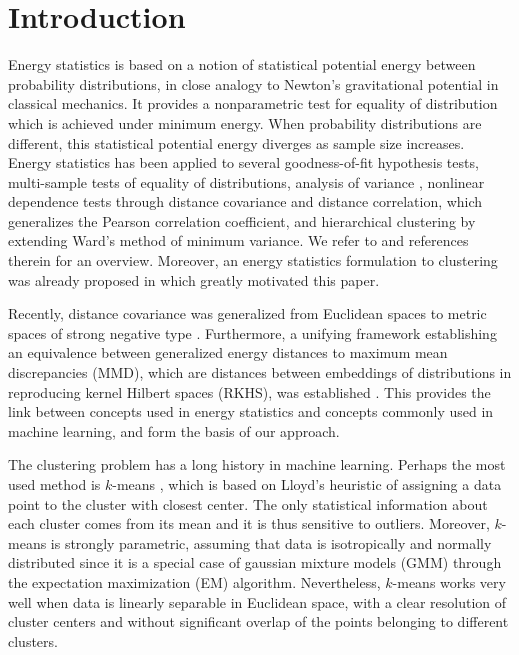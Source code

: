 \documentclass[aps,preprint,nofootinbib,floatfix]{revtex4-1}
\begin{document}
\section{Introduction}

Energy statistics \cite{Szkely2013}
is based on a 
notion of statistical potential energy between probability distributions,
in close analogy to Newton's gravitational
potential in classical mechanics. 
It provides a nonparametric test for equality of distribution which
is achieved under minimum energy. When probability distributions
are different, this statistical potential 
energy diverges as sample size increases.
Energy statistics has been applied to several goodness-of-fit 
hypothesis tests, 
multi-sample tests of equality of distributions, analysis of variance
\cite{RizzoVariance}, nonlinear
dependence tests through
distance covariance and distance correlation, which generalizes the Pearson
correlation coefficient, and  
hierarchical clustering \cite{RizzoClustering} by extending Ward's
method of minimum variance. We refer to \cite{Szkely2013} and 
references therein for an overview.
Moreover, an energy statistics formulation
to clustering was already proposed in \cite{Kgroups} 
which greatly motivated this paper.

Recently, distance covariance was 
generalized from Euclidean
spaces to metric spaces of strong negative type \cite{Lyons}.
Furthermore, a unifying framework establishing an equivalence
between generalized energy distances to maximum
mean discrepancies (MMD), which are distances between embeddings of
distributions in reproducing kernel Hilbert spaces (RKHS), was
established \cite{Sejdinovic2013}. This provides the 
link between concepts used in energy statistics and concepts
commonly used in machine learning, and form the basis of our approach.

The clustering problem has a long history in machine learning.
Perhaps the most used method is $k$-means \cite{Lloyd,MacQueen,Forgy}, which
is based on Lloyd's heuristic \cite{Lloyd} of assigning a data point to
the cluster with closest center. The only statistical 
information about each cluster
comes from its mean and it is thus sensitive to outliers. 
Moreover, $k$-means
is strongly parametric, assuming that data is isotropically and normally
distributed since it is a special case of gaussian mixture models (GMM) 
through the expectation maximization (EM) algorithm. Nevertheless,
$k$-means works very well when data is linearly separable 
in Euclidean space, with a clear resolution of cluster centers and without
significant overlap of the points belonging to different clusters.
\end{document}
